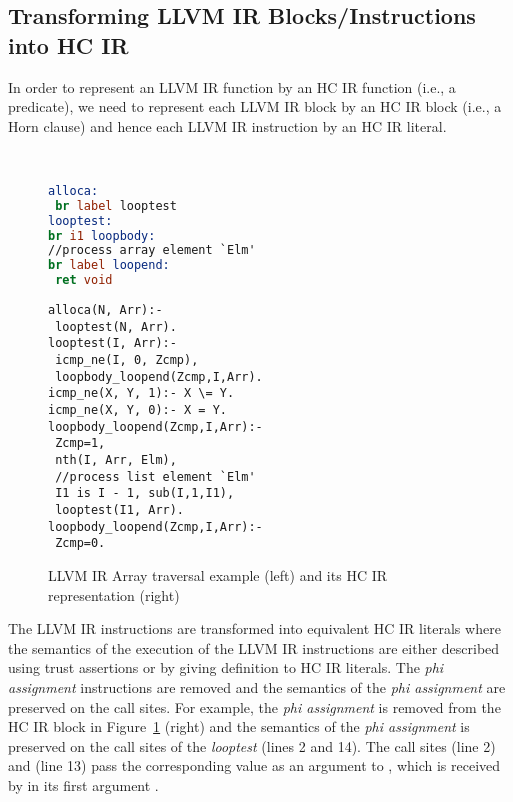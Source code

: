 \documentclass{llncs}
\newcommand{\hcir}{HC IR\xspace}
\newcommand{\llvmir}{LLVM IR\xspace}
\newcommand{\figend}{\vspace*{-5mm}}
\begin{document}
\subsection{Transforming \llvmir Blocks/Instructions into \hcir}
\label{sec:llvm2isa-block-trans}

In order to represent an \llvmir function by an \hcir
function (i.e., a predicate), we need to represent each \llvmir block by an \hcir block
(i.e., a Horn clause) and hence each \llvmir instruction by an \hcir
literal.

\begin{figure}[ht]
\begin{minipage}[t]{0.04\textwidth}
\ 
\end{minipage}
\begin{minipage}[t]{0.51\textwidth}
\begin{lstlisting}[language=llvm]
alloca:
 br label looptest
looptest:
br i1 loopbody:
//process array element `Elm'
br label loopend:
 ret void
\end{lstlisting}
\end{minipage}
\begin{minipage}[t]{0.45\textwidth}
\begin{lstlisting}[language=hcir]
alloca(N, Arr):-
 looptest(N, Arr).
looptest(I, Arr):-
 icmp_ne(I, 0, Zcmp),
 loopbody_loopend(Zcmp,I,Arr).
icmp_ne(X, Y, 1):- X \= Y.
icmp_ne(X, Y, 0):- X = Y.
loopbody_loopend(Zcmp,I,Arr):-
 Zcmp=1,
 nth(I, Arr, Elm),
 //process list element `Elm'
 I1 is I - 1, sub(I,1,I1),
 looptest(I1, Arr).
loopbody_loopend(Zcmp,I,Arr):-
 Zcmp=0. 
\end{lstlisting}
\end{minipage}
\caption{\llvmir Array traversal example (left) and its \hcir representation (right)}
\label{llvm2hcirblock}
\figend
\end{figure}
  

The \llvmir{} instructions are transformed into equivalent \hcir{} literals where the 
semantics of the execution of the \llvmir{} instructions are either described using trust assertions or by giving definition to \hcir{} literals. The \textit{phi assignment} instructions are removed and the semantics of the \textit{phi assignment} are preserved on the call sites. For example, the \emph{phi assignment}
is removed from the \hcir block in Figure~\ref{llvm2hcirblock} (right) and the semantics of the \emph{phi assignment}
is preserved on the call sites of the \textit{looptest}
(lines 2 and 14).  The call sites  (line 2) and  (line 13) pass the
corresponding value as an argument to , which is received by  in
its first argument .  
\end{document}
